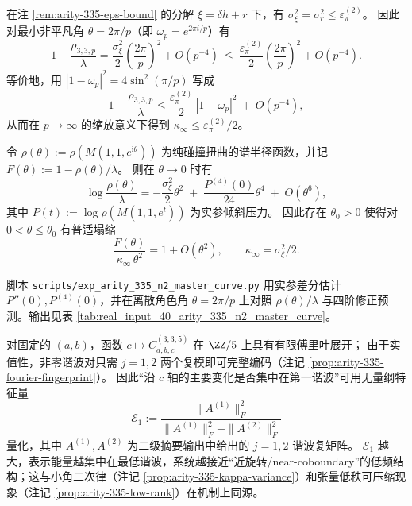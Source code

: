 \begin{remark}\label{cor:arity-335-eps-trig-bound}
在注 \ref{rem:arity-335-eps-bound} 的分解 \(\xi=\delta h+r\) 下，有 \(\sigma_\xi^2=\sigma_r^2\le \varepsilon_\pi^{(2)}\)。
因此对最小非平凡角 \(\theta=2\pi/p\)（即 \(\omega_p=e^{2\pi i/p}\)）有
$$
1-\frac{\rho_{3,3,p}}{\lambda}
=
\frac{\sigma_\xi^2}{2}\left(\frac{2\pi}{p}\right)^2+O(p^{-4})
\ \le\
\frac{\varepsilon_\pi^{(2)}}{2}\left(\frac{2\pi}{p}\right)^2+O(p^{-4}).
$$
等价地，用 \(|1-\omega_p|^2=4\sin^2(\pi/p)\) 写成
$$
1-\frac{\rho_{3,3,p}}{\lambda}
\le
\frac{\varepsilon_\pi^{(2)}}{2}\,|1-\omega_p|^2\ +\ O(p^{-4}),
$$
从而在 \(p\to\infty\) 的缩放意义下得到 \(\kappa_\infty\le \varepsilon_\pi^{(2)}/2\)。
\end{remark}

\begin{remark}\label{prop:arity-335-master-curve}
令 \(\rho(\theta):=\rho(M(1,1,e^{\mathrm{i}\theta}))\) 为纯碰撞扭曲的谱半径函数，并记
\(
F(\theta):=1-\rho(\theta)/\lambda
\)。
则在 \(\theta\to 0\) 时有
$$
\log\frac{\rho(\theta)}{\lambda}
=
-\frac{\sigma_\xi^2}{2}\theta^2
\;+\;
\frac{P^{(4)}(0)}{24}\theta^4
\;+\;
O(\theta^6),
$$
其中 \(P(t):=\log\rho(M(1,1,e^{t}))\) 为实参倾斜压力。
因此存在 \(\theta_0>0\) 使得对 \(0<\theta\le \theta_0\) 有普适塌缩
$$
\frac{F(\theta)}{\kappa_\infty\,\theta^2}=1+O(\theta^2),
\qquad
\kappa_\infty=\sigma_\xi^2/2.
$$
\end{remark}

\begin{remark}[可复现核验：离散角色点 \texorpdfstring{$\theta=2\pi/p$}{theta=2pi/p} 的主曲线对照]\label{rem:arity-335-master-curve-check}
脚本 \texttt{scripts/exp\_arity\_335\_n2\_master\_curve.py} 用实参差分估计 \(P''(0),P^{(4)}(0)\)，并在离散角色角 \(\theta=2\pi/p\) 上对照 \(\rho(\theta)/\lambda\) 与四阶修正预测。输出见表 \ref{tab:real_input_40_arity_335_n2_master_curve}。
\end{remark}



\begin{remark}\label{rem:arity-335-harmonic-energy}
对固定的 \((a,b)\)，函数 \(c\mapsto C^{(3,3,5)}_{a,b,c}\) 在 \(\ZZ/5\) 上具有有限傅里叶展开；
由于实值性，非零谐波对只需 \(j=1,2\) 两个复模即可完整编码（注记 \ref{prop:arity-335-fourier-fingerprint}）。
因此“沿 \(c\) 轴的主要变化是否集中在第一谐波”可用无量纲特征量
$$
\mathcal{E}_1
:=\frac{\|A^{(1)}\|_F^2}{\|A^{(1)}\|_F^2+\|A^{(2)}\|_F^2}
$$
量化，其中 \(A^{(1)},A^{(2)}\) 为二级摘要输出中给出的 \(j=1,2\) 谐波复矩阵。
\(\mathcal{E}_1\) 越大，表示能量越集中在最低谐波，系统越接近“近旋转/near-coboundary”的低频结构；这与小角二次律（注记 \ref{prop:arity-335-kappa-variance}）和张量低秩可压缩现象（注记 \ref{prop:arity-335-low-rank}）在机制上同源。
\end{remark}

